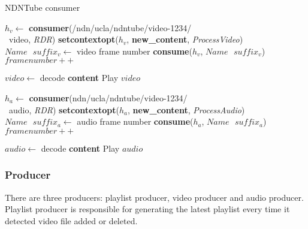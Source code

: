 \begin{algorithm}%
\caption{NDNTube consumer}
\label{alg:recordconsumer}
\begin{algorithmic}[4]
\State $h_v \leftarrow $ \textbf{consumer}(/ndn/ucla/ndntube/video-1234/ \\\ video, \textit{RDR})
\State \textbf{setcontextopt}($h_v$, \textbf{new\_content}, \textit{ProcessVideo})
\vspace{0.2cm}
	\State $Name \textbf{ } suffix_v \leftarrow $ video frame number
	\State \textbf{consume}($h_v$, $Name\textbf{ }suffix_v$)
	\State $framenumber ++$
	\EndWhile
\vspace{0.2cm}

   \State $video \leftarrow $ decode \textbf{content}
   \State Play $video$
\EndFunction

\vspace{0.4cm}

\State $h_a \leftarrow $ \textbf{consumer}(ndn/ucla/ndntube/video-1234/ \\\ audio, \textit{RDR})
\State \textbf{setcontextopt}($h_a$, \textbf{new\_content}, \textit{ProcessAudio})
\vspace{0.2cm}
	\State $Name \textbf{ } suffix_a \leftarrow $ audio frame number
	\State \textbf{consume}($h_a$, $Name\textbf{ }suffix_a$)
	\State $framenumber ++$
	\EndWhile
\vspace{0.2cm}

   	\State $audio \leftarrow $ decode \textbf{content}
   	\State Play $audio$
\EndFunction
\end{algorithmic}
\end{algorithm}

\subsubsection{Producer}

There are three producers: playlist producer, video producer and audio producer.
Playlist producer is responsible for generating the latest playlist every time it detected video file added or deleted.

